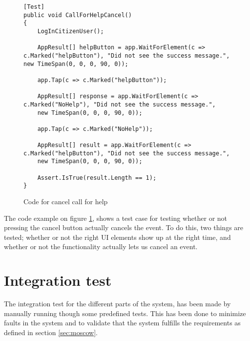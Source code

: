 \begin{figure}[H]
    \centering
    \begin{lstlisting}
[Test]
public void CallForHelpCancel()
{
    LogInCitizenUser();
 
    AppResult[] helpButton = app.WaitForElement(c => c.Marked("helpButton"), "Did not see the success message.", new TimeSpan(0, 0, 0, 90, 0));
 
    app.Tap(c => c.Marked("helpButton"));
 
    AppResult[] response = app.WaitForElement(c => c.Marked("NoHelp"), "Did not see the success message.",
    new TimeSpan(0, 0, 0, 90, 0));
 
    app.Tap(c => c.Marked("NoHelp"));
 
    AppResult[] result = app.WaitForElement(c => c.Marked("helpButton"), "Did not see the success message.",
    new TimeSpan(0, 0, 0, 90, 0));
 
    Assert.IsTrue(result.Length == 1);
}
    \end{lstlisting}
    \caption{Code for cancel call for help}
    \label{fig:test:cancelHelp}
\end{figure}

The code example on figure \ref{fig:test:cancelHelp}, shows a test case for testing whether or not pressing the cancel button actually cancels the event. To do this, two things are tested; whether or not the right UI elements show up at the right time, and whether or not the functionality actually lets us cancel an event.


\newpage
\section{Integration test}
\label{sec:integration-test}
The integration test for the different parts of the system, has been made by manually running though some predefined tests. This has been done to minimize faults in the system and to validate that the system fulfills the requirements as defined in section \ref{sec:moscow}.


